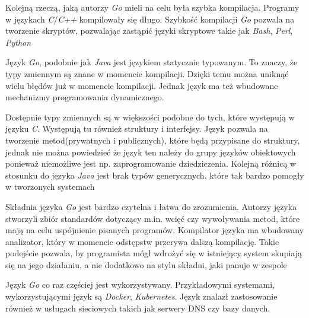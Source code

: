 Kolejną rzeczą, jaką autorzy \textsl{Go} mieli na celu była szybka kompilacja. Programy w językach \textsl{C}/\textsl{C++} kompilowały się długo. Szybkość kompilacji \textsl{Go} pozwala na tworzenie skryptów, pozwalając zastąpić języki skryptowe takie jak \textsl{Bash}, \textsl{Perl}, \textsl{Python}

Język \textsl{Go}, podobnie jak \textsl{Java} jest językiem statycznie typowanym. To znaczy, że typy zmiennym są znane w momencie kompilacji. Dzięki temu można uniknąć wielu błędów już w momencie kompilacji. Jednak język ma też wbudowane mechanizmy programowania dynamicznego. 

Dostępnie typy zmiennych są w większości podobne do tych, które występują w języku \textsl{C}. Występują tu również struktury i interfejsy. Język pozwala na tworzenie metod(prywatnych i publicznych), które będą przypisane do struktury, jednak nie można powiedzieć że język ten należy do grupy języków obiektowych ponieważ niemożliwe jest np. zaprogramowanie dziedziczenia. Kolejną różnicą w stosunku do języka \textsl{Java} jest brak typów generycznych, które tak bardzo pomogły w tworzonych systemach
 
Składnia języka \textsl{Go} jest bardzo czytelna i łatwa do zrozumienia. Autorzy języka stworzyli zbiór standardów dotyczący m.in. wcięć czy wywoływania metod, które mają na celu uspójnienie pisanych programów. Kompilator języka ma wbudowany analizator, który w momencie odstępstw przerywa dalszą kompilację. Takie podejście pozwala, by programista mógł wdrożyć się w istniejący system skupiają się na jego działaniu, a nie dodatkowo na stylu składni, jaki panuje w zespole

Język \textsl{Go} co raz częściej jest wykorzystywany. Przykładowymi systemami, wykorzystującymi język są \textsl{Docker}, \textsl{Kubernetes}. Język znalazł zastosowanie również w usługach sieciowych takich jak serwery DNS czy bazy danych.